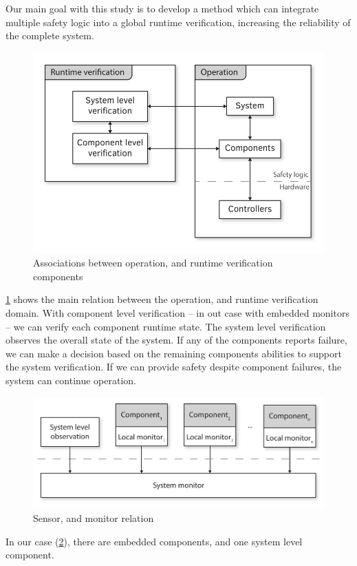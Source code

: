 Our main goal with this study is to develop a method which can integrate multiple safety logic into a global runtime verification, increasing the reliability of the complete system.

\begin{figure}[h]
	\centering
	\includegraphics[width=0.75\linewidth]{include/figures/chapter_6/concept_1}
	\caption{Associations between operation, and runtime verification components}
	\label{fig:case_study:concept_component}
\end{figure}

\cref{fig:case_study:concept_component} shows the main relation between the operation, and runtime verification domain. With component level verification -- in out case with embedded monitors -- we can verify each component runtime state. The system level verification observes the overall state of the system. If any of the components reports failure, we can make a decision based on the remaining components abilities to support the system verification. If we can provide safety despite component failures, the system can continue operation.

\begin{figure}[h]
	\centering
	\includegraphics[width=0.75\linewidth]{include/figures/chapter_6/concept_2}
	\caption{Sensor, and monitor relation}
	\label{fig:case_study:concept_communication}
\end{figure}

In our case (\cref{fig:case_study:concept_communication}), there are embedded components, and one system level component.

